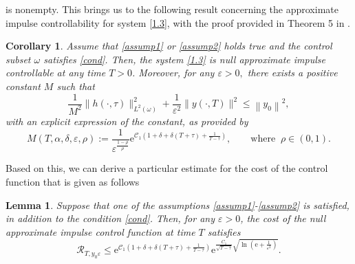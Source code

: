 \documentclass[sn-mathphys]{sn-jnl}
\newtheorem{corollary}{Corollary}
\newtheorem{lemma}[theorem]{Lemma}
\begin{document}
is nonempty. This brings us to the following result concerning the approximate impulse controllability for system \eqref{1.3}, with the proof provided in Theorem 5 in \citep{MMOS}.
\begin{corollary}\label{cor1}
Assume that \eqref{assump1} or \eqref{assump2} holds true and  the control subset $\omega$ satisfies \eqref{cond}. Then, the system \eqref{1.3} is null approximate impulse controllable at any time $T > 0$. Moreover, for any $\varepsilon > 0,$ there exists a positive constant $M$ such that
    \begin{equation}
        \dfrac{1}{M^2}\|h(\cdot,\tau)\|_{L^{2}(\omega)}^{2}+\dfrac{1}{\varepsilon^2}\|y(\cdot, T)\|^{2} \leq\left\|y_0\right\|^{2},
    \end{equation}
with an explicit expression of the constant, as provided by 
    \begin{equation*}
        M(T,\alpha,\delta,\varepsilon,\rho) :=\dfrac{1}{\varepsilon^{\frac{1-\rho}{\rho}}} \mathrm{e}^{\mathcal{C}_1\left(1+ \delta+\delta(T+\tau)+ \frac{1}{T-\tau}\right)}, \qquad \text{where}\;\; \rho \in (0,1).
    \end{equation*}
\end{corollary}
Based on this, we can derive a particular estimate for the cost of the control function that is given as follows
\begin{lemma}\label{lem2.5}
    Suppose that one of the assumptions \eqref{assump1}-\eqref{assump2} is satisfied, in addition to the condition \eqref{cond}. Then, for any $\varepsilon >0$, the cost of the null approximate impulse control function at time $T$ satisfies
    \begin{equation}
        \mathcal{R}_{T,y_0\varepsilon} \leq \mathrm{e}^{ \mathcal{C}_1\left(1+\delta+ \delta(T+\tau) +\frac{1}{T-\tau}\right)} \mathrm{e}^{\frac{C_1}{\sqrt{T-\tau}}\sqrt{\ln\left(\mathrm{e}+\frac{1}{\varepsilon^2}\right)}}.
    \end{equation}
\end{lemma}
\end{document}
